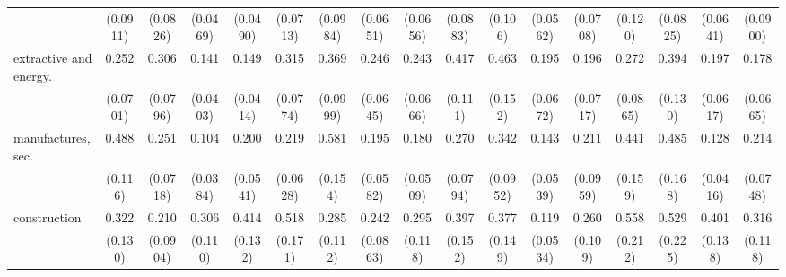{\begin{tabular}{l*{16}{c}}
                    &    (0.0911)         &    (0.0826)         &    (0.0469)         &    (0.0490)         &    (0.0713)         &    (0.0984)         &    (0.0651)         &    (0.0656)         &    (0.0883)         &     (0.106)         &    (0.0562)         &    (0.0708)         &     (0.120)         &    (0.0825)         &    (0.0641)         &    (0.0900)         \\
[1em]
extractive and energy.&       0.252\sym{***}&       0.306\sym{***}&       0.141\sym{***}&       0.149\sym{***}&       0.315\sym{***}&       0.369\sym{***}&       0.246\sym{***}&       0.243\sym{***}&       0.417\sym{***}&       0.463\sym{*}  &       0.195\sym{***}&       0.196\sym{***}&       0.272\sym{***}&       0.394\sym{**} &       0.197\sym{***}&       0.178\sym{***}\\
                    &    (0.0701)         &    (0.0796)         &    (0.0403)         &    (0.0414)         &    (0.0774)         &    (0.0999)         &    (0.0645)         &    (0.0666)         &     (0.111)         &     (0.152)         &    (0.0672)         &    (0.0717)         &    (0.0865)         &     (0.130)         &    (0.0617)         &    (0.0665)         \\
[1em]
manufactures, sec.  &       0.488\sym{**} &       0.251\sym{***}&       0.104\sym{***}&       0.200\sym{***}&       0.219\sym{***}&       0.581\sym{*}  &       0.195\sym{***}&       0.180\sym{***}&       0.270\sym{***}&       0.342\sym{***}&       0.143\sym{***}&       0.211\sym{***}&       0.441\sym{*}  &       0.485\sym{*}  &       0.128\sym{***}&       0.214\sym{***}\\
                    &     (0.116)         &    (0.0718)         &    (0.0384)         &    (0.0541)         &    (0.0628)         &     (0.154)         &    (0.0582)         &    (0.0509)         &    (0.0794)         &    (0.0952)         &    (0.0539)         &    (0.0959)         &     (0.159)         &     (0.168)         &    (0.0416)         &    (0.0748)         \\
[1em]
construction        &       0.322\sym{**} &       0.210\sym{***}&       0.306\sym{***}&       0.414\sym{**} &       0.518\sym{*}  &       0.285\sym{**} &       0.242\sym{***}&       0.295\sym{**} &       0.397\sym{*}  &       0.377\sym{*}  &       0.119\sym{***}&       0.260\sym{**} &       0.558         &       0.529         &       0.401\sym{**} &       0.316\sym{**} \\
                    &     (0.130)         &    (0.0904)         &     (0.110)         &     (0.132)         &     (0.171)         &     (0.112)         &    (0.0863)         &     (0.118)         &     (0.152)         &     (0.149)         &    (0.0534)         &     (0.109)         &     (0.212)         &     (0.225)         &     (0.138)         &     (0.118)         \\

\end{tabular}}
